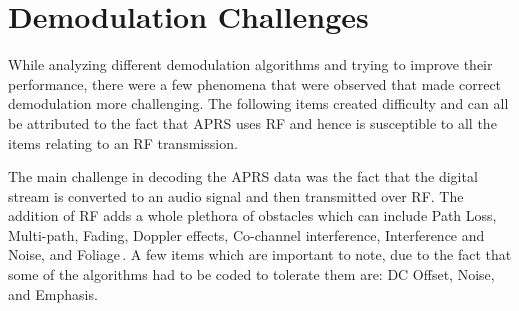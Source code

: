 \chapter{Demodulation Challenges}
While analyzing different demodulation algorithms and trying to improve their performance, there were a few phenomena that were observed that made correct demodulation more challenging. The following items created difficulty and can all be attributed to the fact that APRS uses RF and hence is susceptible to all the items relating to an RF transmission. 

The main challenge in decoding the APRS data was the fact that the digital stream is converted to an audio signal and then transmitted over RF. The addition of RF adds a whole plethora of obstacles which can include Path Loss, Multi-path, Fading, Doppler effects, Co-channel interference, Interference and Noise, and Foliage\,\cite{Goleniewski2006}. A few items which are important to note, due to the fact that some of the algorithms had to be coded to tolerate them are: DC Offset, Noise, and Emphasis.

